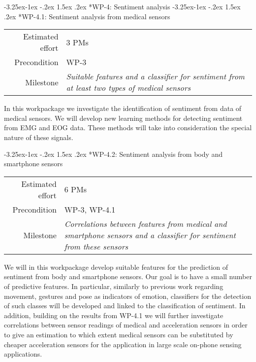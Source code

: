 \documentclass[12pt]{article}
\makeatletter
\newcommand{\kobyc}[1]{\begin{center}\fbox{\parbox{3in}{{\textcolor{green}{K: #1}}}}\end{center}}
\renewcommand\paragraph{\@startsection{paragraph}{4}{\z@}%
  {-3.25ex\@plus -1ex \@minus -.2ex}%
  {1.5ex \@plus .2ex}%
  {\normalfont\normalsize\bfseries}}
\makeatother
\begin{document}
\paragraph*{WP-4: Sentiment analysis}
\paragraph*{WP-4.1: Sentiment analysis from medical sensors}
\begin{tabular}{rl}
 Estimated effort& 3 PMs\\
 Precondition & WP-3\\
 Milestone & \begin{minipage}[t]{12.2cm}
\textit{Suitable features and a classifier for sentiment from at least two types of medical sensors}\vspace{.2cm}
             \end{minipage}
\end{tabular}

\noindent
In this workpackage we investigate the identification of sentiment from data of medical sensors. 
We will develop new learning methods for detecting sentiment from EMG and EOG data. 
These methods will take into consideration the special nature of these signals.

\paragraph*{WP-4.2: Sentiment analysis from body and smartphone sensors}
\begin{tabular}{rl}
 Estimated effort& 6 PMs\\
 Precondition & WP-3, WP-4.1\\
 Milestone & \begin{minipage}[t]{12.2cm}
\textit{Correlations between features from medical and smartphone sensors and a classifier for sentiment from these sensors}\vspace{.2cm}
             \end{minipage}
\end{tabular}

\noindent
We will in this workpackage develop suitable features for the prediction of sentiment from body and smartphone sensors. Our goal is to have a small number of predictive features. 
In particular, similarly to previous work regarding movement, gestures and pose as indicators of emotion, classifiers for the detection of such classes will be developed and linked to the classification of sentiment. 
In addition, building on the results from WP-4.1 we will further investigate correlations between sensor readings of medical and acceleration sensors in order to give an estimation to which extent medical sensors can be substituted by cheaper acceleration sensors for the application in large scale on-phone sensing applications.
\end{document}
